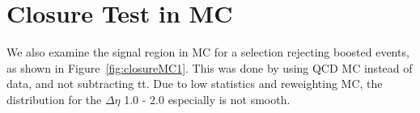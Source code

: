 
\section{Closure Test in MC\label{ss:BkgValInMC}}

We also examine the signal region in MC for a selection rejecting boosted events, as shown in Figure~\ref{fig:closureMC1}. This was done by using QCD MC instead of data, and not subtracting tt. Due to low statistics and reweighting MC, the distribution for the $\Delta\eta$ 1.0 - 2.0 especially is not smooth.

